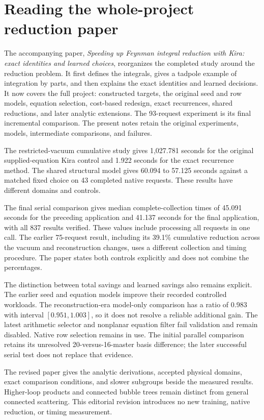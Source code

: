 \section{Reading the whole-project reduction paper}
\label{notes:paper-reading-guide}
The accompanying paper, \emph{Speeding up Feynman integral reduction with Kira: exact identities and learned choices}, reorganizes the completed study around the reduction problem. It first defines the integrals, gives a tadpole example of integration by parts, and then explains the exact identities and learned decisions. It now covers the full project: constructed targets, the original seed and row models, equation selection, cost-based redesign, exact recurrences, shared reductions, and later analytic extensions. The 93-request experiment is its final incremental comparison. The present notes retain the original experiments, models, intermediate comparisons, and failures.

The restricted-vacuum cumulative study gives 1,027.781 seconds for the original supplied-equation Kira control and 1.922 seconds for the exact recurrence method. The shared structural model gives 60.094 to 57.125 seconds against a matched fixed choice on 43 completed native requests. These results have different domains and controls.

The final serial comparison gives median complete-collection times of 45.091 seconds for the preceding application and 41.137 seconds for the final application, with all 837 results verified. These values include processing all requests in one call. The earlier 75-request result, including its 39.1\% cumulative reduction across the vacuum and reconstruction changes, uses a different collection and timing procedure. The paper states both controls explicitly and does not combine the percentages.

The distinction between total savings and learned savings also remains explicit. The earlier seed and equation models improve their recorded controlled workloads. The reconstruction-era model-only comparison has a ratio of 0.983 with interval $[0.951,1.003]$, so it does not resolve a reliable additional gain. The latest arithmetic selector and nonplanar equation filter fail validation and remain disabled. Native row selection remains in use. The initial parallel comparison retains its unresolved 20-versus-16-master basis difference; the later successful serial test does not replace that evidence.

The revised paper gives the analytic derivations, accepted physical domains, exact comparison conditions, and slower subgroups beside the measured results. Higher-loop products and connected bubble trees remain distinct from general connected scattering. This editorial revision introduces no new training, native reduction, or timing measurement.
